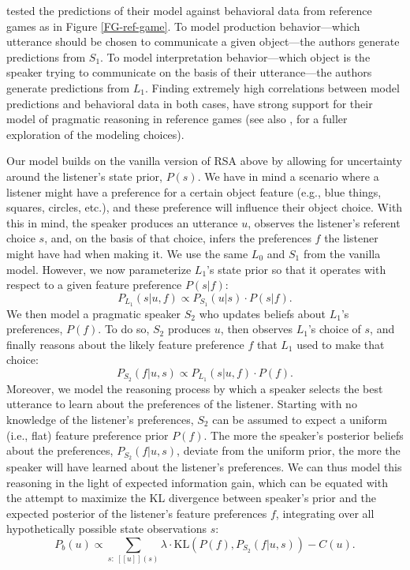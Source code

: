 \documentclass[10pt,a4paper]{article}
\begin{document}
 tested the predictions of their model against behavioral data from reference games as in Figure \ref{FG-ref-game}. To model production behavior---which utterance should be chosen to communicate a given object---the authors generate predictions from $S_1$. To model interpretation behavior---which object is the speaker trying to communicate on the basis of their utterance---the authors generate predictions from $L_1$. Finding extremely high correlations between model predictions and behavioral data in both cases, \citeauthor{frankgoodman2012} have strong support for their model of pragmatic reasoning in reference games (see also , for a fuller exploration of the modeling choices).

Our model builds on the vanilla version of RSA above by allowing for uncertainty around the listener's state prior, $P(s)$. We have in mind a scenario where a listener might have a preference for a certain object feature (e.g., blue things, squares, circles, etc.), and these preference will influence their object choice. With this in mind, the speaker produces an utterance $u$, observes the listener's referent choice $s$, and, on the basis of that choice, infers the preferences $f$ the listener might have had when making it.
We use the same $L_0$ and $S_1$ from the vanilla model. However, we now parameterize $L_1$'s state prior so that it operates with respect to a given feature preference $P(s|f)$:
$$P_{L_{1}}(s|u,f) \propto P_{S_{1}}(u|s) \cdot P(s|f).$$
We then model a pragmatic speaker $S_2$ who updates beliefs about $L_1$'s preferences, $P(f)$. To do so, $S_2$ produces $u$, then observes $L_1$'s choice of $s$, and finally reasons about the likely feature preference $f$ that $L_1$ used to make that choice:
$$P_{S_{2}}(f|u,s) \propto P_{L_{1}}(s|u,f) \cdot P(f).$$
Moreover, we model the reasoning process by which a speaker selects the best utterance to learn about the preferences of the listener.
Starting with no knowledge of the listener's preferences, $S_2$ can be assumed to expect a uniform (i.e., flat) feature preference prior $P(f)$. The more the speaker's posterior beliefs about the preferences, $P_{S_{2}}(f|u,s)$, deviate from the uniform prior, the more the speaker will have learned about the listener's preferences. 
We can thus model this reasoning in the light of expected information gain, which can be equated with the attempt to maximize the KL divergence between speaker's prior and the expected posterior of the listener's feature preferences $f$, integrating over all hypothetically possible state observations $s$:
$$P_{b}(u) \propto \sum_{s:\  [\![u]\!](s)}\lambda \cdot \textrm{KL}(P(f),P_{S_{2}}(f|u,s))-C(u).$$
\end{document}
